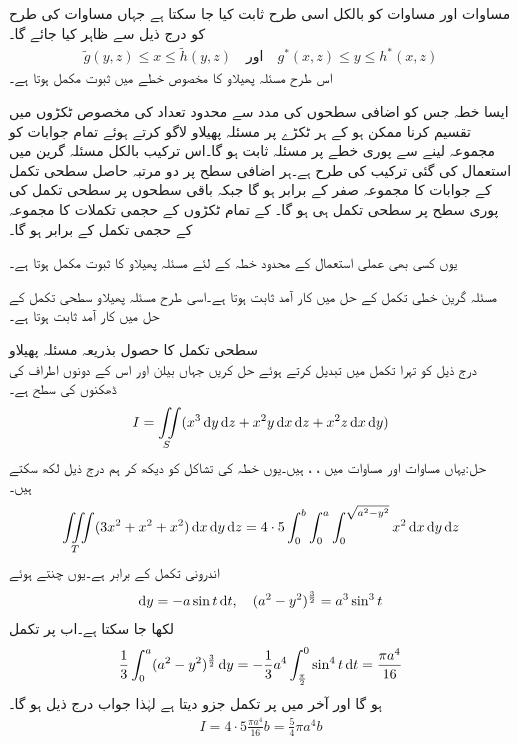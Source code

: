 مساوات  اور مساوات  کو بالکل اسی طرح ثابت کیا جا سکتا ہے جہاں مساوات  کی طرح  کو درج ذیل سے ظاہر کیا جائے گا۔
\begin{align*}
\tilde{g}(y,z) \le x\le \tilde{h}(y,z) \quad \text{اور}\quad g^*(x,z) \le y\le h^*(x,z)
\end{align*}
اس طرح مسئلہ پھیلاو کا مخصوص خطے میں ثبوت مکمل ہوتا ہے۔

ایسا خطہ  جس کو اضافی سطحوں کی مدد سے محدود تعداد کی مخصوص ٹکڑوں میں تقسیم کرنا ممکن ہو کے ہر ٹکڑے پر مسئلہ پھیلاو لاگو کرتے ہوئے تمام جوابات کو مجموعہ لینے سے  پوری خطے پر مسئلہ ثابت ہو گا۔اس ترکیب بالکل مسئلہ گرین میں استعمال کی گئی ترکیب کی طرح ہے۔ہر اضافی سطح پر دو مرتبہ حاصل سطحی تکمل کے جوابات  کا مجموعہ صفر کے برابر ہو گا جبکہ باقی سطحوں پر سطحی تکمل  کی پوری سطح  پر سطحی تکمل ہی ہو گا۔ کے تمام ٹکڑوں کے حجمی تکملات کا مجموعہ  کے حجمی تکمل کے برابر ہو گا۔

یوں کسی بھی عملی استعمال کے محدود خطہ  کے لئے مسئلہ پھیلاو کا ثبوت مکمل ہوتا ہے۔ 

مسئلہ گرین خطی تکمل کے حل میں کار آمد ثابت ہوتا ہے۔اسی طرح مسئلہ پھیلاو سطحی تکمل کے حل میں کار آمد ثابت ہوتا ہے۔

\quad سطحی تکمل کا حصول بذریعہ مسئلہ پھیلاو\\
درج ذیل کو تہرا  تکمل میں تبدیل کرتے ہوئے حل کریں جہاں  بیلن  اور اس کے دونوں اطراف کی ڈھکنوں کی سطح ہے۔
\begin{align*}
I=\iint\limits_S (x^3\dif y\dif z+x^2y\dif x\dif z+x^2z\dif x\dif y)
\end{align*}
حل:یہاں مساوات  اور مساوات  میں ، ،  ہیں۔یوں خطہ  کی تشاکل کو دیکھ کر ہم درج ذیل لکھ سکتے ہیں۔
\begin{align*}
\iiint\limits_T (3x^2+x^2+x^2)\dif x\dif y\dif z=4\cdot 5\int_0^b \int_0^a\int_0^{\sqrt{a^2-y^2}}x^2\dif x\dif y\dif z
\end{align*}
اندرونی تکمل  کے برابر ہے۔یوں  چنتے ہوئے
\begin{align*}
\dif y=-a\sin t\dif t,\quad (a^2-y^2)^{\frac{3}{2}}=a^3\sin^3 t
\end{align*}
لکھا جا سکتا ہے۔اب  پر تکمل
\begin{align*}
\frac{1}{3}\int_0^a (a^2-y^2)^{\frac{3}{2}}\dif y=-\frac{1}{3} a^4\int_{\frac{\pi}{2}}^{0}\sin^4 t \dif t=\frac{\pi a^4}{16}
\end{align*}
ہو گا اور آخر میں  پر تکمل جزو  دیتا  ہے لہٰذا جواب درج ذیل ہو گا۔
\begin{align*}
I=4\cdot 5\frac{\pi a^4}{16}b=\frac{5}{4}\pi a^4b
\end{align*}

